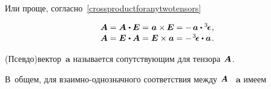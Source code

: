 \begin{otherlanguage}{russian}
Или проще, согласно~\eqref{crossproductforanytwotensors}

\nopagebreak\vspace{-0.1em}\begin{equation*}\begin{array}{c}
\bm{A} = \bm{A} \hspace{.1ex} \dotp \UnitDyad = \hspace{.1ex} \bm{a} \times \hspace{-0.1ex} \UnitDyad = - \hspace{.3ex} \bm{a} \dotp \permutationsparitytensor
\hspace{.1ex} ,
\\[.1em]
\bm{A} = \UnitDyad \hspace{.1ex} \dotp \bm{A} = \UnitDyad \times \bm{a} = - \hspace{.2ex} \permutationsparitytensor \dotp \bm{a}
\hspace{.2ex} .
\end{array}\end{equation*}

(Псевдо)вектор~$\bm{a}$ называется сопутствующим для тензора~${\hspace{-0.2ex}\bm{A}}$.

В~общем, для взаимно\hbox{-}однозначного соответствия между~${\hspace{-0.2ex}\bm{A}}$ ~$\bm{a}$ имеем

\end{otherlanguage}

